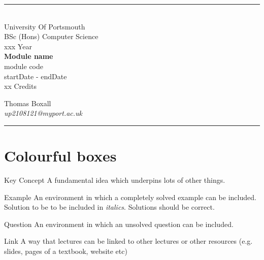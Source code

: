 \documentclass[a4paper, 11pt]{report}
\begin{document}
\begin{titlepage}
    \rule{\textwidth}{1px}
    \vspace{0.025\textheight}\\
    \huge{University Of Portsmouth}\\
    \huge{BSc (Hons) Computer Science}\\
    \huge{xxx Year}\\
    \vfill
    \LARGE{\textbf{Module name}}\\
    \Large{module code}\\
    \large{startDate - endDate}\\
    \large{xx Credits}
    \vfill

    
    \begin{FlushRight}
        \large{Thomas Boxall}\\
        \textit{up2108121@myport.ac.uk}\\
        
    \end{FlushRight}
    \vspace{0.2\textheight}
    \rule{\textwidth}{1px}
    
\end{titlepage}

\tableofcontents
\chapter*{Colourful boxes}
    

    \begin{keyconcept}{Key Concept}
    A fundamental idea which underpins lots of other things.
    \end{keyconcept}

    \begin{example}{Example}
        An environment in which a completely solved example can be included. Solution to be to be included in \textit{italics}. Solutions should be correct.
    \end{example}

    \begin{question}{Question}
        An environment in which an unsolved question can be included. 
    \end{question}

    \begin{link}{Link}
        A way that lectures can be linked to other lectures or other resources (e.g. slides, pages of a textbook, website etc)
    \end{link}
\end{document}

